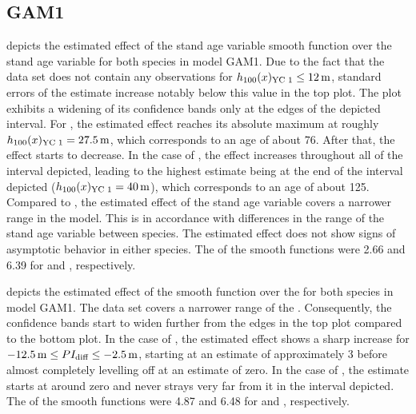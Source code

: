 \subsection{GAM1}

 depicts the estimated effect of the stand age variable smooth function over the stand age variable for both species in model GAM1.
Due to the fact that the \Beech{} data set does not contain any observations for \(h_{100}(x)_{\text{YC 1}}{} \leq \SI{12}{\meter}\), standard errors of the estimate increase notably below this value in the top plot.  The \Spruce{} plot exhibits a widening of its confidence bands only at the edges of the depicted interval.
For \Beech{}, the estimated effect reaches its absolute maximum at roughly \(h_{100}(x)_{\text{YC 1}}{} = \SI{27.5}{\meter}\), which corresponds to an age of about \SI{76}{\year}.  After that, the effect starts to decrease.  In the case of \Spruce{}, the effect increases throughout all of the interval depicted, leading to the highest estimate being at the end of the interval depicted (\(h_{100}(x)_{\text{YC 1}}{} = \SI{40}{\meter}\)), which corresponds to an age of about \SI{125}{\year}.  Compared to \Spruce{}, the estimated effect of the stand age variable covers a narrower range in the \Beech{} model.  This is in accordance with differences in the range of the stand age variable between species.  The estimated effect does not show signs of asymptotic behavior in either species.  The \edf{} of the smooth functions were \num{2.66} and \num{6.39} for \Beech{} and \Spruce{}, respectively.

 depicts the estimated effect of the \ProductivityIndexVariableText{} smooth function over the \ProductivityIndexVariableText{} for both species in model GAM1.
The \Beech{} data set covers a narrower range of the \ProductivityIndexVariableText{}.  Consequently, the confidence bands start to widen further from the edges in the top plot compared to the bottom plot.  In the case of \Beech{}, the estimated effect shows a sharp increase for \(\SI{-12.5}{\meter} \leq PI_{\text{diff}}{} \leq \SI{-2.5}{\meter}\), starting at an estimate of approximately \num{3} before almost completely levelling off at an estimate of zero.  In the case of \Spruce{}, the estimate starts at around zero and never strays very far from it in the interval depicted.  The \edf{} of the smooth functions were \num{4.87} and \num{6.48} for \Beech{} and \Spruce{}, respectively.

